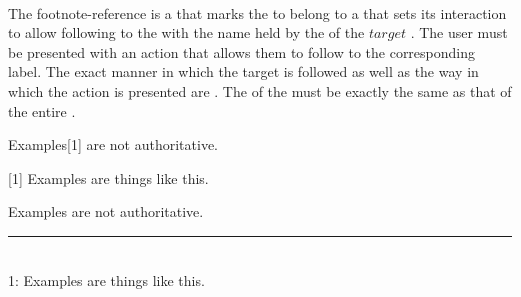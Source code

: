  \\

The footnote-reference is a  that marks the  to belong to a  that sets its interaction to allow following to the  with the name held by the  of the \inline$target$ . The user must be presented with an action that allows them to follow to the corresponding label. The exact manner in which the target is followed as well as the way in which the action is presented are . The  of the  must be exactly the same as that of the entire .\\

\begin{examples}
  \begin{examplesource}
    Examples[1] are not authoritative.
    
    [1] Examples are things like this.
  \end{examplesource}
  \begin{exampleoutput}
    Examples\raisebox{.4ex}{\scriptsize \hyperref[footnote:ex2]{[1]}} are not authoritative. \\
    \rule{0.2\textwidth}{1pt} \\
    \label{footnote:ex2}1: Examples are things like this.
  \end{exampleoutput}
\end{examples}

